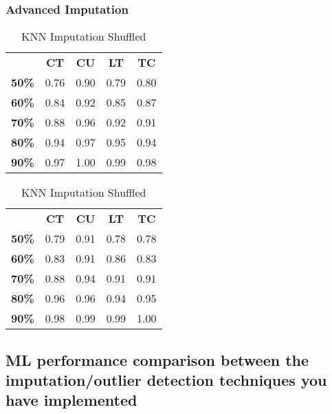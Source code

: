 \documentclass{article}
\begin{document}
\subsubsection{Advanced Imputation}
\begin{table}[h]
\begin{minipage}{.45\textwidth}\centering
\begin{tabular}{ccccc}
              & \textbf{CT} & \textbf{CU} & \textbf{LT} & \textbf{TC} \\
\textbf{50\%} & 0.76        & 0.90        & 0.79        & 0.80        \\
\textbf{60\%} & 0.84        & 0.92        & 0.85        & 0.87        \\
\textbf{70\%} & 0.88        & 0.96        & 0.92        & 0.91        \\
\textbf{80\%} & 0.94        & 0.97        & 0.95        & 0.94        \\
\textbf{90\%} & 0.97        & 1.00        & 0.99        & 0.98       
\end{tabular}
\caption{KNN Imputation}
\end{minipage}
\hfill
\begin{minipage}{.45\textwidth}\centering
\begin{tabular}{ccccc}
              & \textbf{CT} & \textbf{CU} & \textbf{LT} & \textbf{TC} \\
\textbf{50\%} & 0.79        & 0.91        & 0.78        & 0.78        \\
\textbf{60\%} & 0.83        & 0.91        & 0.86        & 0.83        \\
\textbf{70\%} & 0.88        & 0.94        & 0.91        & 0.91        \\
\textbf{80\%} & 0.96        & 0.96        & 0.94        & 0.95        \\
\textbf{90\%} & 0.98        & 0.99        & 0.99        & 1.00       
\end{tabular}
\caption{KNN Imputation Shuffled}
\end{minipage}
\end{table}

\subsection{ML performance comparison between the imputation/outlier detection techniques you have implemented}
\end{document}
